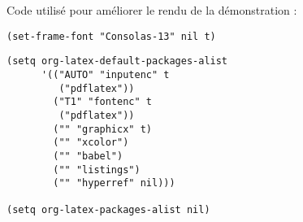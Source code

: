 \documentclass[french]{report}
\begin{document}
Code utilisé pour améliorer le rendu de la démonstration :

\lstset{language=Lisp,label= ,caption= ,captionpos=b,numbers=none}
\begin{lstlisting}
(set-frame-font "Consolas-13" nil t)
\end{lstlisting}

\lstset{language=Lisp,label= ,caption= ,captionpos=b,numbers=none}
\begin{lstlisting}
(setq org-latex-default-packages-alist
      '(("AUTO" "inputenc" t
         ("pdflatex"))
        ("T1" "fontenc" t
         ("pdflatex"))
        ("" "graphicx" t)
        ("" "xcolor")
        ("" "babel")
        ("" "listings")
        ("" "hyperref" nil)))

(setq org-latex-packages-alist nil)
\end{lstlisting}
\end{document}
